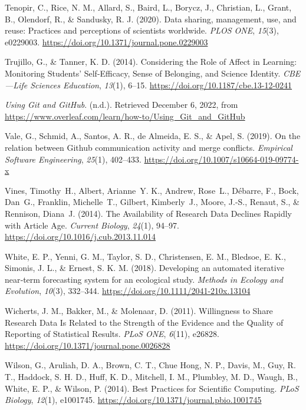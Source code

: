 \begin{CSLReferences}{1}{0}
\leavevmode{}%
Tenopir, C., Rice, N. M., Allard, S., Baird, L., Borycz, J., Christian, L., Grant, B., Olendorf, R., \& Sandusky, R. J. (2020). Data sharing, management, use, and reuse: Practices and perceptions of scientists worldwide. \emph{PLOS ONE}, \emph{15}(3), e0229003. \url{https://doi.org/10.1371/journal.pone.0229003}

\leavevmode{}%
Trujillo, G., \& Tanner, K. D. (2014). Considering the Role of Affect in Learning: Monitoring Students' Self-Efficacy, Sense of Belonging, and Science Identity. \emph{CBE---Life Sciences Education}, \emph{13}(1), 6--15. \url{https://doi.org/10.1187/cbe.13-12-0241}

\leavevmode{}%
\emph{Using Git and GitHub}. (n.d.). Retrieved December 6, 2022, from \url{https://www.overleaf.com/learn/how-to/Using_Git_and_GitHub}

\leavevmode{}%
Vale, G., Schmid, A., Santos, A. R., de Almeida, E. S., \& Apel, S. (2019). On the relation between Github communication activity and merge conflicts. \emph{Empirical Software Engineering}, \emph{25}(1), 402--433. \url{https://doi.org/10.1007/s10664-019-09774-x}

\leavevmode{}%
Vines, Timothy~H., Albert, Arianne~Y. K., Andrew, Rose~L., Débarre, F., Bock, Dan~G., Franklin, Michelle~T., Gilbert, Kimberly~J., Moore, J.-S., Renaut, S., \& Rennison, Diana~J. (2014). The Availability of Research Data Declines Rapidly with Article Age. \emph{Current Biology}, \emph{24}(1), 94--97. \url{https://doi.org/10.1016/j.cub.2013.11.014}

\leavevmode{}%
White, E. P., Yenni, G. M., Taylor, S. D., Christensen, E. M., Bledsoe, E. K., Simonis, J. L., \& Ernest, S. K. M. (2018). Developing an automated iterative near‐term forecasting system for an ecological study. \emph{Methods in Ecology and Evolution}, \emph{10}(3), 332--344. \url{https://doi.org/10.1111/2041-210x.13104}

\leavevmode{}%
Wicherts, J. M., Bakker, M., \& Molenaar, D. (2011). Willingness to Share Research Data Is Related to the Strength of the Evidence and the Quality of Reporting of Statistical Results. \emph{PLoS ONE}, \emph{6}(11), e26828. \url{https://doi.org/10.1371/journal.pone.0026828}

\leavevmode{}%
Wilson, G., Aruliah, D. A., Brown, C. T., Chue Hong, N. P., Davis, M., Guy, R. T., Haddock, S. H. D., Huff, K. D., Mitchell, I. M., Plumbley, M. D., Waugh, B., White, E. P., \& Wilson, P. (2014). Best Practices for Scientific Computing. \emph{PLoS Biology}, \emph{12}(1), e1001745. \url{https://doi.org/10.1371/journal.pbio.1001745}


\end{CSLReferences}
